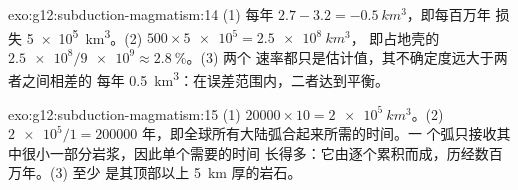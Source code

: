 \begin{solution}{exo:g12:subduction-magmatism:14}
(1) 每年 $2.7 - 3.2 = \qty{-0.5}{km^3}$，即每百万年
损失 \qty{5e5}{km^3}。(2) $500 \times \num{5e5} = \qty{2.5e8}{km^3}$，
即占地壳的 $\num{2.5e8}/\num{9e9} \approx \qty{2.8}{\percent}$。(3) 两个
速率都只是估计值，其不确定度远大于两者之间相差的
每年 \qty{0.5}{km^3}：在误差范围内，二者达到平衡。
\end{solution}

\begin{solution}{exo:g12:subduction-magmatism:15}
(1) $\num{20000} \times 10 = \qty{2e5}{km^3}$。(2) $\num{2e5}/1 =
\num{200000}$ 年，即全球所有大陆弧合起来所需的时间。一
个弧只接收其中很小一部分岩浆，因此单个需要的时间
长得多：它由逐个累积而成，历经数百万年。(3) 至少
是其顶部以上 \qty{5}{km} 厚的岩石。
\end{solution}

